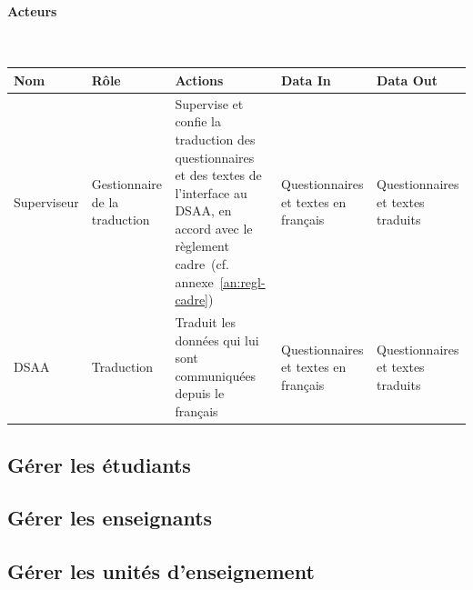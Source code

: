 \documentclass[a4paper,11pt]{report}
\begin{document}
\paragraph{Acteurs}~\newline{}

\begin{tabularx}{\linewidth}{|X|X|X|X|X|} \hline
Nom & Rôle & Actions & Data In & Data Out \\ \hline 
Superviseur & Gestionnaire de la traduction & Supervise et confie la traduction des questionnaires et des textes de l'interface au DSAA, en accord avec le règlement cadre~(cf. annexe~\ref{an:regl-cadre}) & Questionnaires et textes en français & Questionnaires et textes traduits \\ 
DSAA & Traduction & Traduit les données qui lui sont communiquées depuis le français & Questionnaires et textes en français & Questionnaires et textes traduits \\ \hline
\end{tabularx}





\subsection{Gérer les étudiants}\label{sec:gerer-etud}




\subsection{Gérer les enseignants}\label{sec:gerer-enseignant}




\subsection{Gérer les unités d'enseignement}\label{sec:gerer-ue}
\end{document}
